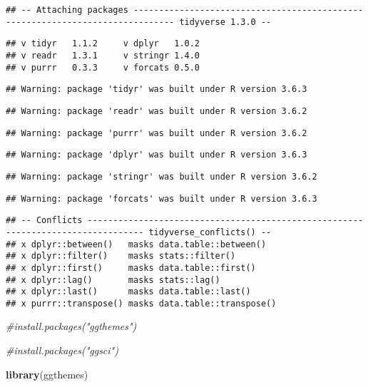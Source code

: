 \documentclass[
]{article}
\newenvironment{Shaded}{\begin{snugshade}}{\end{snugshade}}
\newcommand{\CommentTok}[1]{\textcolor[rgb]{0.56,0.35,0.01}{\textit{#1}}}
\newcommand{\KeywordTok}[1]{\textcolor[rgb]{0.13,0.29,0.53}{\textbf{#1}}}
\newcommand{\NormalTok}[1]{#1}
\begin{document}
\begin{verbatim}
## -- Attaching packages ------------------------------------------------------------------------------ tidyverse 1.3.0 --
\end{verbatim}

\begin{verbatim}
## v tidyr   1.1.2     v dplyr   1.0.2
## v readr   1.3.1     v stringr 1.4.0
## v purrr   0.3.3     v forcats 0.5.0
\end{verbatim}

\begin{verbatim}
## Warning: package 'tidyr' was built under R version 3.6.3
\end{verbatim}

\begin{verbatim}
## Warning: package 'readr' was built under R version 3.6.2
\end{verbatim}

\begin{verbatim}
## Warning: package 'purrr' was built under R version 3.6.2
\end{verbatim}

\begin{verbatim}
## Warning: package 'dplyr' was built under R version 3.6.3
\end{verbatim}

\begin{verbatim}
## Warning: package 'stringr' was built under R version 3.6.2
\end{verbatim}

\begin{verbatim}
## Warning: package 'forcats' was built under R version 3.6.3
\end{verbatim}

\begin{verbatim}
## -- Conflicts --------------------------------------------------------------------------------- tidyverse_conflicts() --
## x dplyr::between()   masks data.table::between()
## x dplyr::filter()    masks stats::filter()
## x dplyr::first()     masks data.table::first()
## x dplyr::lag()       masks stats::lag()
## x dplyr::last()      masks data.table::last()
## x purrr::transpose() masks data.table::transpose()
\end{verbatim}

\begin{Shaded}
\begin{Highlighting}[]
\CommentTok{#install.packages("ggthemes") }

\CommentTok{#install.packages("ggsci")}

\KeywordTok{library}\NormalTok{(ggthemes)}
\end{Highlighting}
\end{Shaded}
\end{document}
